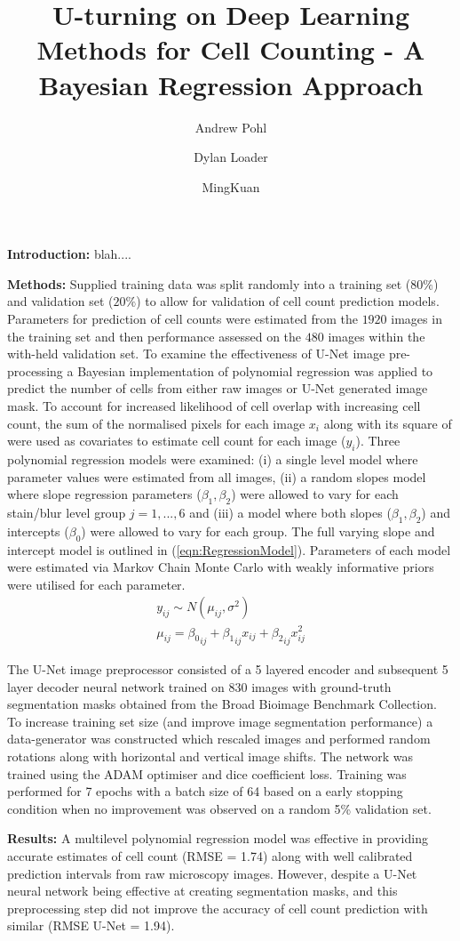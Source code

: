 \documentclass[11pt, letterpaper]{article}
\title{\large U-turning on Deep Learning Methods for Cell Counting - A Bayesian Regression Approach}
\author[1]{\normalsize Andrew Pohl}
\author[2]{\normalsize Dylan Loader}
\author[2]{\normalsize MingKuan}
\affil[1]{\small Faculty of Kinesiology - \textit{University of Calgary}}
\affil[2]{\small Department of Mathematics and Statistics - \textit{University of Calgary}}
\date{}
\begin{document}
\maketitle
\textbf{Introduction:}
blah....

\textbf{Methods:} 
Supplied training data was split randomly into a training set ($80\%$) and validation set ($20\%$) to allow for validation of cell count prediction models.  Parameters for prediction of cell counts were estimated from the $1920$ images in the training set and then performance assessed on the $480$ images within the with-held validation set. To examine the effectiveness of U-Net image pre-processing a Bayesian implementation of polynomial regression was applied to predict the number of cells from either raw images or U-Net generated image mask.  To account for increased likelihood of cell overlap with increasing cell count, the sum of the normalised pixels for each image $x_i$ along with its square of were used as covariates to estimate cell count for each image ($y_i$). Three polynomial regression models were examined: (i) a single level model where parameter values were estimated from all images, (ii) a random slopes model where slope regression parameters ($\beta_1, \beta_2$) were allowed to vary for each stain/blur level group $j = 1, ..., 6$ and (iii) a model where both slopes ($\beta_1, \beta_2$) and intercepts ($\beta_0$) were allowed to vary for each group.  The full varying slope and intercept model is outlined in  (\ref{eqn:RegressionModel}). Parameters of each model were estimated via Markov Chain Monte Carlo with weakly informative priors were utilised for each parameter.
\begin{align}
y_{ij} \sim N(\mu_{ij}, \sigma^2) \nonumber\\
\mu_{ij} = {\beta_0}_{ij} + {\beta_1}_{ij} x_{ij} + {\beta_2}_{ij} x_{ij}^2 \label{eqn:RegressionModel}
\end{align}     

     The U-Net image preprocessor consisted of a 5 layered encoder and subsequent 5 layer decoder neural network trained on 830 images with ground-truth segmentation masks obtained from the Broad Bioimage Benchmark Collection. To increase training set size (and improve image segmentation performance) a data-generator was constructed which rescaled images and performed random rotations along with horizontal and vertical image shifts.  The network was trained using the ADAM optimiser and dice coefficient loss. Training was performed for 7 epochs with a batch size of 64 based on a early stopping condition when no improvement was observed on a random 5\% validation set.

\textbf{Results:}
A multilevel polynomial regression model was effective in providing accurate estimates of cell count (RMSE = 1.74) along with well calibrated prediction intervals from raw microscopy images.  However, despite a U-Net neural network being effective at creating segmentation masks, and this preprocessing step did not improve the accuracy of cell count prediction with similar (RMSE U-Net = 1.94). 

%
\end{document}
